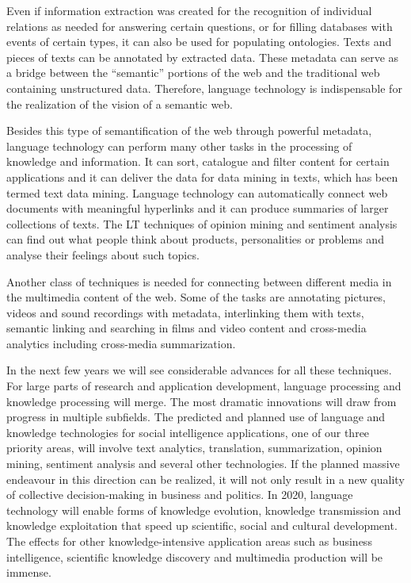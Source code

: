 \begin{multicols}{2}
Even if information extraction was created for the recognition of individual relations as needed for answering certain questions, or for filling databases with events of certain types, it can also be used for populating ontologies. Texts and pieces of texts can be annotated by extracted data. These metadata can serve as a bridge between the “semantic” portions of the web and the traditional web containing unstructured data. Therefore, language technology is indispensable for the realization of the vision of a semantic web. 
 
Besides this type of semantification of the web through powerful metadata, language technology can perform many other tasks in the processing of knowledge and information. It can sort, catalogue and filter content for certain applications and it can deliver the data for data mining in texts, which has been termed text data mining. Language technology can automatically connect web documents with meaningful hyperlinks and it can produce summaries of larger collections of texts. The LT techniques of opinion mining and sentiment analysis can find out what people think about products, personalities or problems and analyse their feelings about such topics.
 
Another class of techniques is needed for connecting between different media in the multimedia content of the web. Some of the tasks are annotating pictures, videos and sound recordings with metadata, interlinking them with texts, semantic linking and searching in films and video content and cross-media analytics including cross-media summarization.
 
In the next few years we will see considerable advances for all these techniques. For large parts of research and application development, language processing and knowledge processing will merge. The most dramatic innovations will draw from progress in multiple subfields. The predicted and planned use of language and knowledge technologies for social intelligence applications, one of our three priority areas, will involve text analytics, translation, summarization, opinion mining, sentiment analysis and several other technologies. If the planned massive endeavour in this direction can be realized, it will not only result in a new quality of collective decision-making in business and politics. In 2020, language technology will enable forms of knowledge evolution, knowledge transmission and knowledge exploitation that speed up scientific, social and cultural development. The effects for other knowledge-intensive application areas such as business intelligence, scientific knowledge discovery and multimedia production will be immense.


\end{multicols}
